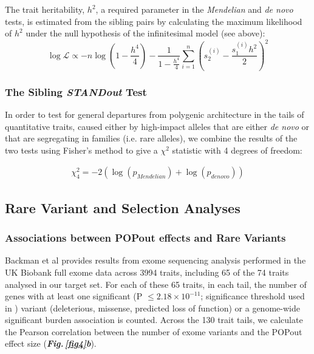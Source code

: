 \documentclass[12pt]{zHenriquesLab-StyleBioRxiv}
\newcommand\dref[2]{\normalsize{\textbf{\textit{Fig.\,\ref{#1}#2}}}\normalsize{}}
\begin{document}
The trait heritability, $h^2$, a required parameter in the {\em Mendelian} and {\em de novo} tests, 
is estimated from the sibling pairs by calculating the maximum likelihood of $h^2$ 
under the null hypothesis of the infinitesimal model (see above): 
\begin{equation*} \log \mathcal{L} \propto -n\log\left(1 -
    \frac{h^4}{4}\right) - \frac{1}{1-\frac{h^4}{4}} \sum_{i=1}^n
  \left( s_{2}^{(i)} - \frac{s_1^{(i)} h^2}{2}
  \right)^2
\end{equation*}

\subsubsection*{The Sibling \textit{STANDout}  Test} 

In order to test for general departures from polygenic architecture in the tails of 
quantitative traits, caused either by high-impact alleles that are either \emph{de novo} or 
that are segregating in families (i.e. rare alleles), we combine the results of the two tests 
using Fisher's method to give a $\chi^2$ statistic with 4 degrees of freedom: 

\begin{align*}
    \chi^2_4 = -2(\log(p_{Mendelian}) + \log(p_{de novo}))
\end{align*}

\subsection*{Rare Variant and Selection Analyses} \label{sec:methods:rvs} 

\subsubsection*{Associations between POPout effects and Rare Variants}
Backman et al \cite{Backman2021} provides results from exome sequencing analysis 
performed in the UK Biobank full exome data across 3994 traits, including 65 of 
the 74 traits analysed in our target set. For each of these 65 traits, in each tail, 
the number of genes with at least one significant (P $\le 2.18\times 10^{-11}$; significance 
threshold used in \cite{Backman2021}) variant (deleterious, missense, predicted loss of function) or a 
genome-wide significant burden association is counted. Across the 130 trait tails, we 
calculate the Pearson correlation between the number of exome variants and the POPout 
effect size (\dref{fig4}{b}). 
%
\end{document}
